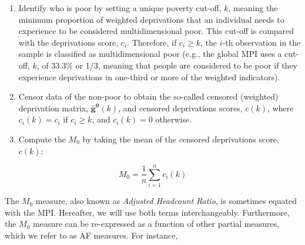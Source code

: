 \begin{enumerate}
\item
  Identify who is poor by setting a unique poverty cut-off, \(k\), meaning the minimum proportion of weighted deprivations that an individual needs to experience to be considered multidimensional poor. This cut-off is compared with the deprivations score, \(c_i\). Therefore, if \(c_{i} \geq k\), the \(i\)-th observation in the sample is classified as multidimensional poor (e.g., the global MPI uses a cut-off, \(k\), of 33.3\% or 1/3, meaning that people are considered to be poor if they experience deprivations in one-third or more of the weighted indicators).
\item
  Censor data of the non-poor to obtain the so-called censored (weighted) deprivation matrix, \(\mathbf{\bar{g}^0}(k)\), and censored deprivations scores, \(c(k)\), where \(c_{i} (k) = c_{i}\) if \(c_{i} \geq k\), and \(c_{i} (k) = 0\) otherwise.
\item
  Compute the \(M_0\) by taking the mean of the censored deprivations score, \(c(k)\):
\end{enumerate}

\begin{equation}\label{eq:M0}
M_0 = \frac{1}{n} \sum_{i=1}^n c_i(k)
\end{equation}

The \(M_0\) measure, also known as \emph{Adjusted Headcount Ratio}, is sometimes equated with the MPI. Hereafter, we will use both terms interchangeably. Furthermore, the \(M_0\) measure can be re-expressed as a function of other partial measures, which we refer to as AF measures. For instance,

